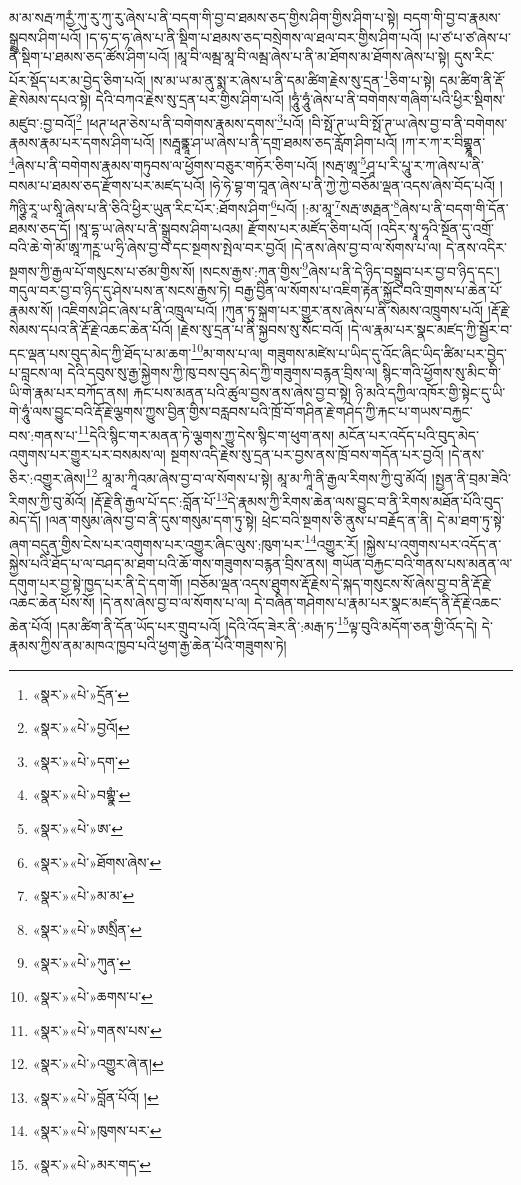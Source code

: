 མ་མ་སརྦ་ཀརྱཾ་ཀུ་རུ་ཀུ་རུ་ཞེས་པ་ནི་བདག་གི་བྱ་བ་ཐམས་ཅད་གྱིས་ཤིག་གྱིས་ཤིག་པ་སྟེ། བདག་གི་བྱ་བ་རྣམས་སྒྲུབས་ཤིག་པའོ། །ད་ཧ་ད་ཧ་ཞེས་པ་ནི་སྡིག་པ་ཐམས་ཅད་བསྲེགས་ལ་ཐལ་བར་གྱིས་ཤིག་པའོ། །པ་ཙ་པ་ཙ་ཞེས་པ་ནི་སྡིག་པ་ཐམས་ཅད་ཚོས་ཤིག་པའོ། །མཱ་བི་ལམྦ་མཱ་བི་ལམྦ་ཞེས་པ་ནི་མ་ཐོགས་མ་ཐོགས་ཞེས་པ་སྟེ། དུས་རིང་པོར་སྡོད་པར་མ་བྱེད་ཅིག་པའོ། །ས་མ་ཡ་མ་ནུ་སྨ་ར་ཞེས་པ་ནི་དམ་ཚིག་རྗེས་སུ་དྲན་\footnote{«སྣར་»«པེ་»དྲོན་}ཅིག་པ་སྟེ། དམ་ཚིག་ནི་རྡོ་རྗེ་སེམས་དཔའ་སྟེ། དེའི་བཀའ་རྗེས་སུ་དྲན་པར་གྱིས་ཤིག་པའོ། །ཧཱུཾ་ཧཱུཾ་ཞེས་པ་ནི་བགེགས་གཞིག་པའི་ཕྱིར་སྡིགས་མཛུབ་:བྱ་བའོ།\footnote{«སྣར་»«པེ་»བྱའོ།} །ཕཊ་ཕཊ་ཅེས་པ་ནི་བགེགས་རྣམས་དགས་\footnote{«སྣར་»«པེ་»དག་}པའོ། །བི་སྥོ་ཊ་ཡ་བི་སྥོ་ཊ་ཡ་ཞེས་བྱ་བ་ནི་བགེགས་རྣམས་རྣམ་པར་དགས་ཤིག་པའོ། །སརྦཱནྣཱ་ཤ་ཡ་ཞེས་པ་ནི་དགྲ་ཐམས་ཅད་རློག་ཤིག་པའོ། །ཀ་ར་ཀ་ར་བིགྷྣཱན་\footnote{«སྣར་»«པེ་»བགྷྣཾ་}ཞེས་པ་ནི་བགེགས་རྣམས་གཏུབས་ལ་ཕྱོགས་བཅུར་གཏོར་ཅིག་པའོ། །སརྦ་ཨཱ་\footnote{«སྣར་»«པེ་»ཨ་}ཤཱ་པ་རི་པཱུ་ར་ཀ་ཞེས་པ་ནི་བསམ་པ་ཐམས་ཅད་རྫོགས་པར་མཛད་པའོ། །ཧེ་ཧེ་བྷ་ག་བཱན་ཞེས་པ་ནི་ཀྱེ་ཀྱེ་བཅོམ་ལྡན་འདས་ཞེས་བོད་པའོ། །ཀིཉྩི་རཱ་ཡ་སཱི་ཞེས་པ་ནི་ཅིའི་ཕྱིར་ཡུན་རིང་པོར་:ཐོགས་ཤིག་\footnote{«སྣར་»«པེ་»ཐོགས་ཞེས་}པའོ། །:མ་མཱ་\footnote{«སྣར་»«པེ་»མ་མ་}སརྦ་ཨརྠན་\footnote{«སྣར་»«པེ་»ཨསྲིཾན་}ཞེས་པ་ནི་བདག་གི་དོན་ཐམས་ཅད་དོ། །སཱ་དྷ་ཡ་ཞེས་པ་ནི་སྒྲུབས་ཤིག་པའམ། རྫོགས་པར་མཛོད་ཅིག་པའོ། །འདིར་སྭཱ་ཧཱའི་སྔོན་དུ་འགྲོ་བའི་ཆེ་གེ་མོ་ཨཱ་ཀཪྵ་ཡ་ཧྲི་ཞེས་བྱ་བ་དང་སྔགས་སྤེལ་བར་བྱའོ། །དེ་ནས་ཞེས་བྱ་བ་ལ་སོགས་པ་ལ། དེ་ནས་འདིར་སྔགས་ཀྱི་རྒྱལ་པོ་གསུངས་པ་ཙམ་གྱིས་སོ། །སངས་རྒྱས་:ཀུན་གྱིས་\footnote{«སྣར་»«པེ་»ཀུན་}ཞེས་པ་ནི་དེ་ཉིད་བསྒྲུབ་པར་བྱ་བ་ཉིད་དང་། གདུལ་བར་བྱ་བ་ཉིད་དུ་ཤེས་པས་ན་སངས་རྒྱས་ཏེ། བརྒྱ་བྱིན་ལ་སོགས་པ་འཇིག་རྟེན་སྐྱོང་བའི་གྲགས་པ་ཆེན་པོ་རྣམས་སོ། །འཇིགས་ཤིང་ཞེས་པ་ནི་འཁྲུལ་པའོ། །ཀུན་ཏུ་སྐྲག་པར་གྱུར་ནས་ཞེས་པ་ནི་སེམས་འཁྲུགས་པའོ། །རྡོ་རྗེ་སེམས་དཔའ་ནི་རྡོ་རྗེ་འཆང་ཆེན་པོའོ། །རྗེས་སུ་དྲན་པ་ནི་སྐྱབས་སུ་སོང་བའོ། །དེ་ལ་རྣམ་པར་སྣང་མཛད་ཀྱི་སྦྱོར་བ་དང་ལྡན་པས་བུད་མེད་ཀྱི་ཐོད་པ་མ་ཆག་\footnote{«སྣར་»«པེ་»ཆགས་པ་}མ་གས་པ་ལ། གཟུགས་མཛེས་པ་ཡིད་དུ་འོང་ཞིང་ཡིད་ཚིམ་པར་བྱེད་པ་བླངས་ལ། དེའི་དབུས་སུ་རྒྱ་སྐྱེགས་ཀྱི་ཁུ་བས་བུད་མེད་ཀྱི་གཟུགས་བརྙན་བྲིས་ལ། སྙིང་གའི་ཕྱོགས་སུ་མིང་གི་ཡི་གེ་རྣམ་པར་བཀོད་ནས། རྐང་པས་མནན་པའི་ཚུལ་བྱས་ནས་ཞེས་བྱ་བ་སྟེ། ཉི་མའི་དཀྱིལ་འཁོར་གྱི་སྟེང་དུ་ཡི་གེ་ཧཱུཾ་ལས་བྱུང་བའི་རྡོ་རྗེ་ལྕགས་ཀྱུས་བྱིན་གྱིས་བརླབས་པའི་ཁྲོ་བོ་གཤིན་རྗེ་གཤེད་ཀྱི་རྐང་པ་གཡས་བརྐྱང་བས་:གནས་པ་\footnote{«སྣར་»«པེ་»གནས་པས་}དེའི་སྙིང་གར་མནན་ཏེ་ལྕགས་ཀྱུ་དེས་སྙིང་ག་ཕུག་ནས། མངོན་པར་འདོད་པའི་བུད་མེད་འགུགས་པར་གྱུར་པར་བསམས་ལ། སྔགས་འདི་རྗེས་སུ་དྲན་པར་བྱས་ནས་ཁྲོ་བས་གདོན་པར་བྱའོ། །དེ་ནས་ཅིར་:འགྱུར་ཞེས།\footnote{«སྣར་»«པེ་»འགྱུར་ཞེ་ན།} མཱ་མ་ཀཱིའམ་ཞེས་བྱ་བ་ལ་སོགས་པ་སྟེ། མཱ་མ་ཀཱི་ནི་རྒྱལ་རིགས་ཀྱི་བུ་མོའོ། །སྤྱན་ནི་བྲམ་ཟེའི་རིགས་ཀྱི་བུ་མོའོ། །རྡོ་རྗེ་ནི་རྒྱལ་པོ་དང་:བློན་པོ་\footnote{«སྣར་»«པེ་»བློན་པོའོ། །}དེ་རྣམས་ཀྱི་རིགས་ཆེན་ལས་བྱུང་བ་ནི་རིགས་མཐོན་པོའི་བུད་མེད་དོ། །ལན་གསུམ་ཞེས་བྱ་བ་ནི་དུས་གསུམ་དག་ཏུ་སྟེ། ཕྲེང་བའི་སྔགས་ཅི་ནུས་པ་བརྗོད་ན་ནི། དེ་མ་ཐག་ཏུ་སྟེ་ཞག་བདུན་གྱིས་ངེས་པར་འགུགས་པར་འགྱུར་ཞིང་ལུས་:ཁུག་པར་\footnote{«སྣར་»«པེ་»ཁུགས་པར་}འགྱུར་རོ། །སྐྱེས་པ་འགུགས་པར་འདོད་ན་སྐྱེས་པའི་ཐོད་པ་ལ་བཤད་མ་ཐག་པའི་ཆོ་གས་གཟུགས་བརྙན་བྲིས་ནས། གཡོན་བརྐྱང་བའི་གནས་པས་མནན་ལ་དགུག་པར་བྱ་སྟེ་ཁྱད་པར་ནི་དེ་དག་གོ། །བཅོམ་ལྡན་འདས་ཐུགས་རྡོ་རྗེས་དེ་སྐད་གསུངས་སོ་ཞེས་བྱ་བ་ནི་རྡོ་རྗེ་འཆང་ཆེན་པོས་སོ། །དེ་ནས་ཞེས་བྱ་བ་ལ་སོགས་པ་ལ། དེ་བཞིན་གཤེགས་པ་རྣམ་པར་སྣང་མཛད་ནི་རྡོ་རྗེ་འཆང་ཆེན་པོའོ། །དམ་ཚིག་ནི་དོན་ཡོད་པར་གྲུབ་པའོ། །དེའི་འོད་ཟེར་ནི་:མརྒ་ཏ་\footnote{«སྣར་»«པེ་»མར་གད་}ལྟ་བུའི་མདོག་ཅན་གྱི་འོད་དེ། དེ་རྣམས་ཀྱིས་ནམ་མཁའ་ཁྱབ་པའི་ཕྱག་རྒྱ་ཆེན་པོའི་གཟུགས་ཏེ། 